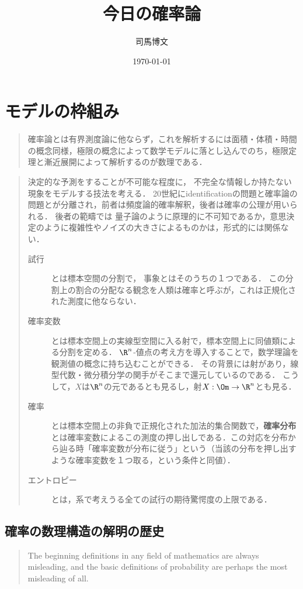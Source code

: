 \documentclass[uplatex,dvipdfmx]{jsreport}
\title{今日の確率論}
\author{司馬博文}
\date{\today}
\begin{document}
\tableofcontents

\chapter{モデルの枠組み}

\begin{quotation}
    確率論とは有界測度論に他ならず，これを解析するには面積・体積・時間の概念同様，極限の概念によって数学モデルに落とし込んでのち，極限定理と漸近展開によって解析するのが数理である．
\end{quotation}

\begin{quotation}
    決定的な予測をすることが不可能な程度に，
    不完全な情報しか持たない現象をモデルする技法を考える．
    20世紀にidentificationの問題と確率論の問題とが分離され，前者は頻度論的確率解釈，後者は確率の公理が用いられる．
    後者の範疇では
    量子論のように原理的に不可知であるか，意思決定のように複雑性やノイズの大きさによるものかは，形式的には関係ない．
    \begin{description}
        \item[試行] とは標本空間の分割で，
        事象とはそのうちの１つである．
        この分割上の割合の分配なる観念を人類は確率と呼ぶが，これは正規化された測度に他ならない．
        \item[確率変数] とは標本空間上の実線型空間に入る射で，標本空間上に同値類による分割を定める．
        $\R^n$-値点の考え方を導入することで，数学理論を観測値の概念に持ち込むことができる．
        その背景には射があり，線型代数・微分積分学の関手がそこまで還元しているのである．
        こうして，$X$は$\R^n$の元であるとも見るし，射$X:\Om\to\R^n$とも見る．
        \item[確率] とは標本空間上の非負で正規化された加法的集合関数で，\textbf{確率分布}とは確率変数によるこの測度の押し出しである．この対応を分布から辿る時「確率変数が分布に従う」という（当該の分布を押し出すような確率変数を１つ取る，という条件と同値）．
        \item[エントロピー] とは，系で考えうる全ての試行の期待驚愕度の上限である．
    \end{description}
\end{quotation}

\section{確率の数理構造の解明の歴史}

\begin{quote}
    The beginning definitions in any field of mathematics
    are always misleading, and the basic definitions of
    probability are perhaps the most misleading of all. \cite{Rota01-TwelveProblem}
\end{quote}
\end{document}

